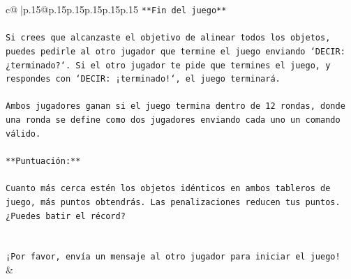 \documentclass{article}
\begin{document}
{\begin{supertabular}{c@{$\;$}|p{.15\linewidth}@{}p{.15\linewidth}p{.15\linewidth}p{.15\linewidth}p{.15\linewidth}p{.15\linewidth}}
{{{\texttt{**Fin del juego**} \\
\\ 
\texttt{Si crees que alcanzaste el objetivo de alinear todos los objetos, puedes pedirle al otro jugador que termine el juego enviando `DECIR: ¿terminado?`. Si el otro jugador te pide que termines el juego, y respondes con `DECIR: ¡terminado!`, el juego terminará.} \\
\\ 
\texttt{Ambos jugadores ganan si el juego termina dentro de 12 rondas, donde una ronda se define como dos jugadores enviando cada uno un comando válido.} \\
\\ 
\texttt{**Puntuación:**} \\
\\ 
\texttt{Cuanto más cerca estén los objetos idénticos en ambos tableros de juego, más puntos obtendrás. Las penalizaciones reducen tus puntos. ¿Puedes batir el récord?} \\
\\ 
\\ 
\texttt{¡Por favor, envía un mensaje al otro jugador para iniciar el juego!} \\
            }
        }
    }
    & \\ \\


\end{supertabular}}
\end{document}

